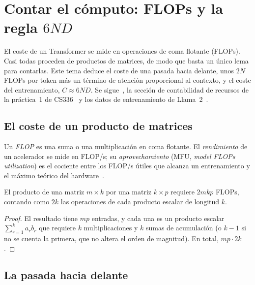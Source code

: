 \chapter{Contar el cómputo: FLOPs y la regla \texorpdfstring{$6ND$}{6ND}}
\label{tema:6}

El coste de un Transformer se mide en operaciones de coma flotante (FLOPs). Casi todas proceden de productos de matrices, de modo que basta un único lema para contarlas. Este tema deduce el coste de una pasada hacia delante, unos $2N$ FLOPs por token más un término de atención proporcional al contexto, y el coste del entrenamiento, $C\approx 6ND$. Se sigue~\cite[§2.1]{kaplan}, la sección de contabilidad de recursos de la práctica~1 de CS336~\cite[§3.5]{cs336} y los datos de entrenamiento de Llama~2~\cite[§2.2.1 y tabla~2]{llama2}.

\section{El coste de un producto de matrices}

\begin{definicion}[FLOP]
Un \emph{FLOP} es una suma o una multiplicación en coma flotante. El \emph{rendimiento} de un acelerador se mide en FLOP/s; su \emph{aprovechamiento} (MFU, \emph{model FLOPs utilization}) es el cociente entre los FLOP/s útiles que alcanza un entrenamiento y el máximo teórico del hardware~\cite[problema \texttt{adamw\_accounting}]{cs336}.
\end{definicion}

\begin{lema}\label{lem:2mkp}
El producto de una matriz $m\times k$ por una matriz $k\times p$ requiere $2mkp$ FLOPs, contando como $2k$ las operaciones de cada producto escalar de longitud $k$.
\end{lema}

\begin{proof}
El resultado tiene $mp$ entradas, y cada una es un producto escalar $\sum_{r=1}^{k}a_rb_r$ que requiere $k$ multiplicaciones y $k$ sumas de acumulación (o $k-1$ si no se cuenta la primera, que no altera el orden de magnitud). En total, $mp\cdot 2k$.
\end{proof}

\section{La pasada hacia delante}

